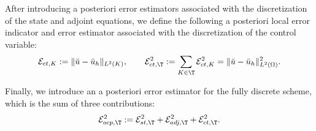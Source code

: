\documentclass[final]{siamart0216}
\begin{document}
After introducing a posteriori error estimators associated with the discretization of the state and adjoint equations, we define the following a posteriori local error indicator and error estimator associated with the discretization of the control variable:
\begin{eqnarray}\label{eq:estimator_control}
\mathcal{E}_{ct,K}:=\|\breve{u}-\bar{u}_{h}\|_{L^2(K)}, \qquad \mathcal{E}_{ct,\T}^2:= \sum_{K\in\T}\mathcal{E}_{ct,K}^2 = \|\breve{u}-\bar{u}_{h}\|_{L^2(\Omega)}^{2}.
\end{eqnarray}

Finally, we introduce an a posteriori error estimator for the fully discrete scheme, which is the sum of three contributions:
\begin{align}\label{eq:error_contributions}
\mathcal{E}_{ocp,\T}^2:=\mathcal{E}_{st,\T}^2 + \mathcal{E}_{adj,\T}^2 + \mathcal{E}_{ct,\T}^2.
\end{align}
\end{document}
